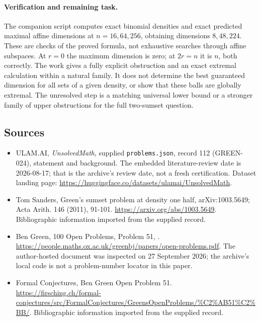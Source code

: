 \documentclass[11pt,a4paper]{article}
\begin{document}
\paragraph{Verification and remaining task.}
The companion script computes exact binomial densities and exact predicted maximal affine dimensions at $n=16,64,256$, obtaining dimensions $8,48,224$. These are checks of the proved formula, not exhaustive searches through affine subspaces. At $r=0$ the maximum dimension is zero; at $2r=n$ it is $n$, both correctly. The work gives a fully explicit obstruction and an exact extremal calculation within a natural family. It does not determine the best guaranteed dimension for all sets of a given density, or show that these balls are globally extremal. The unresolved step is a matching universal lower bound or a stronger family of upper obstructions for the full two-sumset question.

\subsection{Sources}

{\small

\begin{itemize}

\item[\hypertarget{source:112:1}{S1}] ULAM.AI, \emph{UnsolvedMath}, supplied \texttt{problems.json}, record 112 (GREEN-024), statement and background. The embedded literature-review date is 2026-08-17; that is the archive’s review date, not a fresh certification. Dataset landing page: \url{https://huggingface.co/datasets/ulamai/UnsolvedMath}.

\item[\hypertarget{source:112:2}{S2}] Tom Sanders, Green's sumset problem at density one half, arXiv:1003.5649; Acta Arith. 146 (2011), 91-101. \url{https://arxiv.org/abs/1003.5649}. Bibliographic information imported from the supplied record.

\item[\hypertarget{source:112:3}{S3}] Ben Green, 100 Open Problems, Problem 51, . \url{https://people.maths.ox.ac.uk/greenbj/papers/open-problems.pdf}. The author-hosted document was inspected on 27 September 2026; the archive’s local code is not a problem-number locator in this paper.

\item[\hypertarget{source:112:4}{S4}] Formal Conjectures, Ben Green Open Problem 51. \url{https://firsching.ch/formal-conjectures/src/FormalConjectures/GreensOpenProblems/%C2%AB51%C2%BB/}. Bibliographic information imported from the supplied record.

\end{itemize}

}

\label{end:112}
\end{document}
